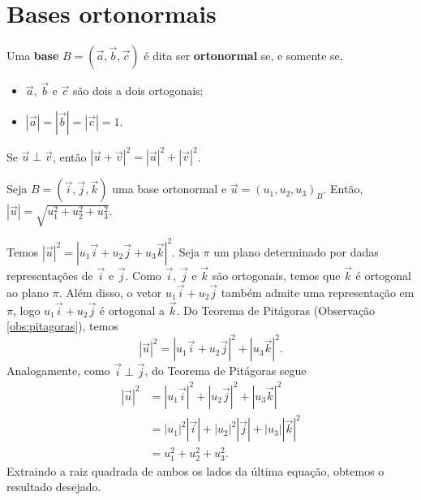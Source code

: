 \emconstrucao

\section{Bases ortonormais}\label{cap_base_sec_baseorto}

Uma {\bf base} $B = (\vec{a}, \vec{b}, \vec{c})$ é dita ser {\bf ortonormal} se, e somente se,
\begin{itemize}
\item $\vec{a}$, $\vec{b}$ e $\vec{c}$ são dois a dois ortogonais;
\item $|\vec{a}|=|\vec{b}|=|\vec{c}|=1$.
\end{itemize}

\begin{obs}\label{obs:pitagoras}
  Se $\vec{u}\perp\vec{v}$, então $|\vec{u}+\vec{v}|^2=|\vec{u}|^2+|\vec{v}|^2$.
\end{obs}

\begin{prop}\label{prop:bo_norma}
  Seja $B = (\vec{i},\vec{j},\vec{k})$ uma base ortonormal e $\vec{u}=(u_1,u_2,u_3)_B$. Então, $|\vec{u}|=\sqrt{u_1^2+u_2^2+u_3^2}$.
\end{prop}
\begin{dem}
  Temos $|\vec{u}|^2 = |u_1\vec{i}+u_2\vec{j}+u_3\vec{k}|^2$. Seja $\pi$ um plano determinado por dadas representações de $\vec{i}$ e $\vec{j}$. Como $\vec{i}$, $\vec{j}$ e $\vec{k}$ são ortogonais, temos que $\vec{k}$ é ortogonal ao plano $\pi$. Além disso, o vetor $u_1\vec{i}+u_2\vec{j}$ também admite uma representação em $\pi$, logo $u_1\vec{i}+u_2\vec{j}$ é ortogonal a $\vec{k}$. Do Teorema de Pitágoras (Observação \ref{obs:pitagoras}), temos
  \begin{equation}
    |\vec{u}|^2 = |u_1\vec{i}+u_2\vec{j}|^2 + |u_3\vec{k}|^2.
  \end{equation}
  Analogamente, como $\vec{i}\perp\vec{j}$, do Teorema de Pitágoras segue
  \begin{align}
    |\vec{u}|^2 &= |u_1\vec{i}|^2 + |u_2\vec{j}|^2 + |u_3\vec{k}|^2\\
                &= |u_1|^2|\vec{i}| + |u_2|^2|\vec{j}| + |u_3||\vec{k}|^2\\
                &= u_1^2 + u_2^2 + u_3^2.
  \end{align}
  Extraindo a raiz quadrada de ambos os lados da última equação, obtemos o resultado desejado.
\end{dem}

